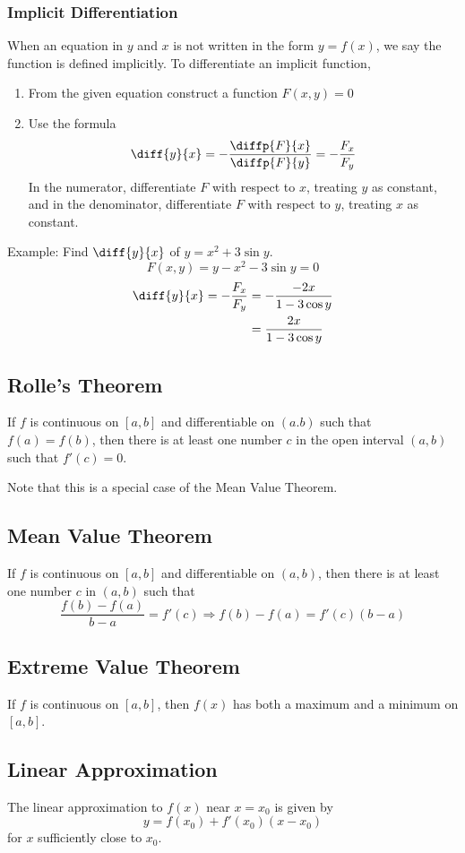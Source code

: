 \documentclass{artikel3}
\begin{document}
\subsubsection{Implicit Differentiation}
When an equation in $y$ and $x$ is not written in the form $y=f(x)$, we say the 
function is defined implicitly. To differentiate an implicit function, 
\begin{enumerate}
\item{From the given equation construct a function $F(x,y)=0$}
\item{Use the formula 
\[ \diff{y}{x}=-\frac{\diffp{F}{x}}{\diffp{F}{y}}=-\frac{F_x}{F_y} \]
In the numerator, differentiate $F$ with respect to $x$, treating $y$ as constant, 
and in the denominator, differentiate $F$ with respect to $y$, treating $x$ as constant.}
\end{enumerate}
Example: Find $\diff{y}{x}$ of $y=x^2+3\sin y$. 
\[ F(x,y)=y-x^2-3\sin y=0 \]
\begin{align*}
\diff{y}{x}=-\frac{F_x}{F_y} &= -\frac{-2x}{1-3\cos y}\\
    &= \frac{2x}{1-3\cos y}
\end{align*}

\subsection{Rolle's Theorem}
If $f$ is continuous on $[a,b]$ and differentiable on $(a.b)$ such that 
$f(a)=f(b)$, then there is at least one number $c$ in the open interval 
$(a,b)$ such that $f'(c)=0$.

Note that this is a special case of the Mean Value Theorem.

\subsection{Mean Value Theorem}
If $f$ is continuous on $[a,b]$ and differentiable on $(a,b)$, then there 
is at least one number $c$ in $(a,b)$ such that 
\[ \frac{f(b)-f(a)}{b-a}=f'(c)\Rightarrow f(b)-f(a)=f'(c)(b-a) \]

\subsection{Extreme Value Theorem}
If $f$ is continuous on $[a,b]$, then $f(x)$ has both a maximum and 
a minimum on $[a,b]$.

\subsection{Linear Approximation}
The linear approximation to $f(x)$ near $x=x_0$ is given by 
\[ y=f(x_0)+f'(x_0)(x-x_0) \]
for $x$ sufficiently close to $x_0$.
\end{document}
